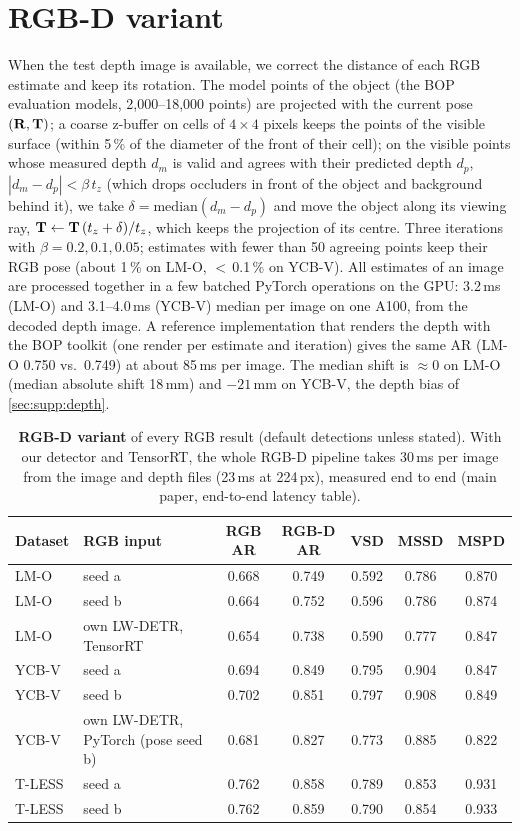 \section{RGB-D variant}
\label{sec:supp:rgbd}
When the test depth image is available, we correct the distance of each RGB estimate and keep its
rotation. The model points of the object (the BOP evaluation models, 2,000--18,000 points) are
projected with the current pose $(\mathbf{R}, \mathbf{T})$; a coarse z-buffer on cells of $4 \times 4$ pixels keeps
the points of the visible surface (within 5\,\% of the diameter of the front of their cell); on the
visible points whose measured depth $d_m$ is valid and agrees with their predicted depth $d_p$,
$|d_m - d_p| < \beta\, t_z$ (which drops occluders in front of the object and background behind
it), we take $\delta = \mathrm{median}(d_m - d_p)$ and move the object along its viewing ray,
$\mathbf{T} \leftarrow \mathbf{T}\, (t_z + \delta) / t_z$, which keeps the projection of its centre. Three
iterations with $\beta = 0.2, 0.1, 0.05$; estimates with fewer than 50 agreeing points keep their
RGB pose (about 1\,\% on LM-O, $<$\,0.1\,\% on YCB-V). All estimates of an image are processed
together in a few batched PyTorch operations on the GPU: 3.2\,ms (LM-O) and 3.1--4.0\,ms (YCB-V)
median per image on one A100, from the decoded depth image. A reference implementation that renders
the depth with the BOP toolkit (one render per estimate and iteration) gives the same AR (LM-O 0.750
vs.\ 0.749) at about 85\,ms per image. The median shift is $\approx 0$ on LM-O (median absolute
shift 18\,mm) and $-21$\,mm on YCB-V, the depth bias of \cref{sec:supp:depth}.

\begin{table}[h]
  \centering
  \setlength{\tabcolsep}{3pt}
  \footnotesize
  \begin{tabular}{llccccc}
    \toprule
    Dataset & RGB input & RGB AR & RGB-D AR & VSD & MSSD & MSPD \\
    \midrule
    LM-O & seed a & 0.668 & 0.749 & 0.592 & 0.786 & 0.870 \\
    LM-O & seed b & 0.664 & 0.752 & 0.596 & 0.786 & 0.874 \\
    LM-O & own LW-DETR, TensorRT & 0.654 & 0.738 & 0.590 & 0.777 & 0.847 \\
    YCB-V & seed a & 0.694 & 0.849 & 0.795 & 0.904 & 0.847 \\
    YCB-V & seed b & 0.702 & 0.851 & 0.797 & 0.908 & 0.849 \\
    YCB-V & own LW-DETR, PyTorch (pose seed b) & 0.681 & 0.827 & 0.773 & 0.885 & 0.822 \\
    T-LESS & seed a & 0.762 & 0.858 & 0.789 & 0.853 & 0.931 \\
    T-LESS & seed b & 0.762 & 0.859 & 0.790 & 0.854 & 0.933 \\
    \bottomrule
  \end{tabular}
  \caption{\textbf{RGB-D variant} of every RGB result (default detections unless stated). With our
  detector and TensorRT, the whole RGB-D pipeline takes 30\,ms per image from the image and depth
  files (23\,ms at 224\,px), measured end to end (main paper, end-to-end latency table).}
  \label{tab:supp:rgbd}
\end{table}

{\small
{}

}



